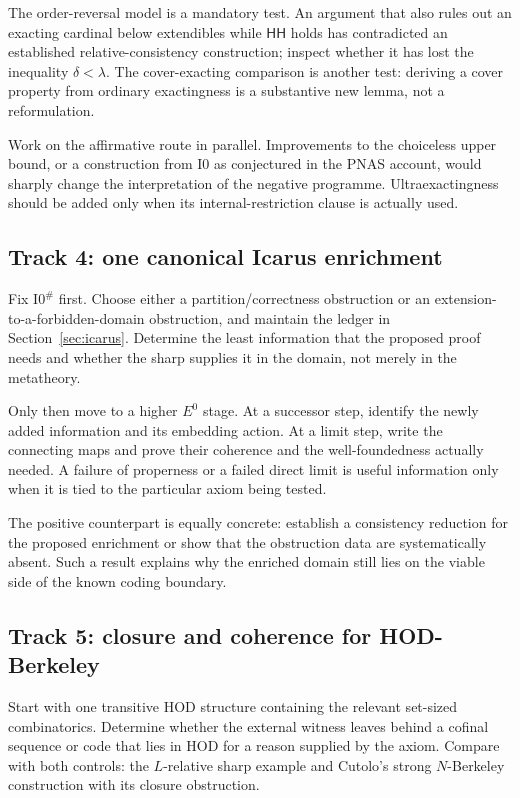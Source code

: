 \documentclass[11pt,letterpaper]{article}
\theoremstyle{definition}
\newcommand{\HH}{\mathsf{HH}}
\newcommand{\Izero}{\mathrm{I0}}
\newcommand{\Isharp}{\mathrm{I0}^{\#}}
\begin{document}
The order-reversal model is a mandatory test. An argument that also rules out an exacting cardinal below extendibles while $\HH$ holds has contradicted an established relative-consistency construction; inspect whether it has lost the inequality $\delta<\lambda$. The cover-exacting comparison is another test: deriving a cover property from ordinary exactingness is a substantive new lemma, not a reformulation.

Work on the affirmative route in parallel. Improvements to the choiceless upper bound, or a construction from $\Izero$ as conjectured in the PNAS account, would sharply change the interpretation of the negative programme. Ultraexactingness should be added only when its internal-restriction clause is actually used.

\subsection{Track 4: one canonical Icarus enrichment}

Fix $\Isharp$ first. Choose either a partition/correctness obstruction or an extension-to-a-forbidden-domain obstruction, and maintain the ledger in Section~\ref{sec:icarus}. Determine the least information that the proposed proof needs and whether the sharp supplies it in the domain, not merely in the metatheory.

Only then move to a higher $E^0$ stage. At a successor step, identify the newly added information and its embedding action. At a limit step, write the connecting maps and prove their coherence and the well-foundedness actually needed. A failure of properness or a failed direct limit is useful information only when it is tied to the particular axiom being tested.

The positive counterpart is equally concrete: establish a consistency reduction for the proposed enrichment or show that the obstruction data are systematically absent. Such a result explains why the enriched domain still lies on the viable side of the known coding boundary.

\subsection{Track 5: closure and coherence for HOD-Berkeley}

Start with one transitive HOD structure containing the relevant set-sized combinatorics. Determine whether the external witness leaves behind a cofinal sequence or code that lies in HOD for a reason supplied by the axiom. Compare with both controls: the $L$-relative sharp example and Cutolo's strong $N$-Berkeley construction with its closure obstruction.
\end{document}
